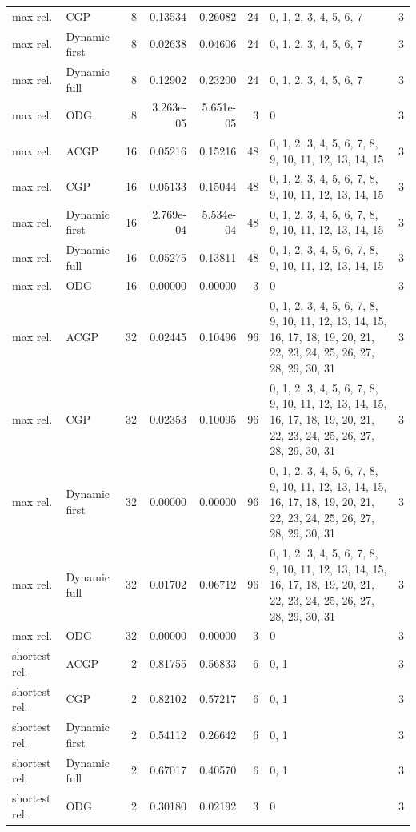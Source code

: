 \documentclass[10pt,a4paper]{article}
\begin{document}
\begin{longtable}{@{}p{23mm}p{29mm}rrrrp{36mm}r@{}}
max rel. & CGP & 8 & 0.13534 & 0.26082 & 24 & 0, 1, 2, 3, 4, 5, 6, 7 & 3 \\
max rel. & Dynamic first & 8 & 0.02638 & 0.04606 & 24 & 0, 1, 2, 3, 4, 5, 6, 7 & 3 \\
max rel. & Dynamic full & 8 & 0.12902 & 0.23200 & 24 & 0, 1, 2, 3, 4, 5, 6, 7 & 3 \\
max rel. & ODG & 8 & 3.263e-05 & 5.651e-05 & 3 & 0 & 3 \\
max rel. & ACGP & 16 & 0.05216 & 0.15216 & 48 & 0, 1, 2, 3, 4, 5, 6, 7, 8, 9, 10, 11, 12, 13, 14, 15 & 3 \\
max rel. & CGP & 16 & 0.05133 & 0.15044 & 48 & 0, 1, 2, 3, 4, 5, 6, 7, 8, 9, 10, 11, 12, 13, 14, 15 & 3 \\
max rel. & Dynamic first & 16 & 2.769e-04 & 5.534e-04 & 48 & 0, 1, 2, 3, 4, 5, 6, 7, 8, 9, 10, 11, 12, 13, 14, 15 & 3 \\
max rel. & Dynamic full & 16 & 0.05275 & 0.13811 & 48 & 0, 1, 2, 3, 4, 5, 6, 7, 8, 9, 10, 11, 12, 13, 14, 15 & 3 \\
max rel. & ODG & 16 & 0.00000 & 0.00000 & 3 & 0 & 3 \\
max rel. & ACGP & 32 & 0.02445 & 0.10496 & 96 & 0, 1, 2, 3, 4, 5, 6, 7, 8, 9, 10, 11, 12, 13, 14, 15, 16, 17, 18, 19, 20, 21, 22, 23, 24, 25, 26, 27, 28, 29, 30, 31 & 3 \\
max rel. & CGP & 32 & 0.02353 & 0.10095 & 96 & 0, 1, 2, 3, 4, 5, 6, 7, 8, 9, 10, 11, 12, 13, 14, 15, 16, 17, 18, 19, 20, 21, 22, 23, 24, 25, 26, 27, 28, 29, 30, 31 & 3 \\
max rel. & Dynamic first & 32 & 0.00000 & 0.00000 & 96 & 0, 1, 2, 3, 4, 5, 6, 7, 8, 9, 10, 11, 12, 13, 14, 15, 16, 17, 18, 19, 20, 21, 22, 23, 24, 25, 26, 27, 28, 29, 30, 31 & 3 \\
max rel. & Dynamic full & 32 & 0.01702 & 0.06712 & 96 & 0, 1, 2, 3, 4, 5, 6, 7, 8, 9, 10, 11, 12, 13, 14, 15, 16, 17, 18, 19, 20, 21, 22, 23, 24, 25, 26, 27, 28, 29, 30, 31 & 3 \\
max rel. & ODG & 32 & 0.00000 & 0.00000 & 3 & 0 & 3 \\
shortest rel. & ACGP & 2 & 0.81755 & 0.56833 & 6 & 0, 1 & 3 \\
shortest rel. & CGP & 2 & 0.82102 & 0.57217 & 6 & 0, 1 & 3 \\
shortest rel. & Dynamic first & 2 & 0.54112 & 0.26642 & 6 & 0, 1 & 3 \\
shortest rel. & Dynamic full & 2 & 0.67017 & 0.40570 & 6 & 0, 1 & 3 \\
shortest rel. & ODG & 2 & 0.30180 & 0.02192 & 3 & 0 & 3 \\

\end{longtable}
\end{document}
